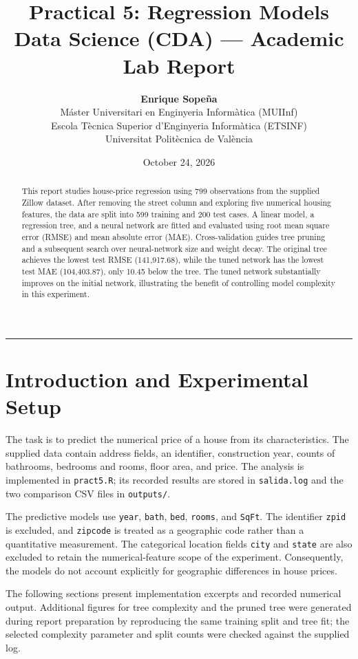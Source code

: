 \documentclass[11pt,a4paper]{article}
\title{\textbf{Practical 5: Regression Models}\\[0.4ex] \Large Data Science (CDA) --- Academic Lab Report}
\author{\textbf{Enrique Sopeña} \\ 
Máster Universitari en Enginyeria Informàtica (MUIInf) \\
Escola Tècnica Superior d'Enginyeria Informàtica (ETSINF) \\ 
Universitat Politècnica de València}
\date{October 24, 2026}
\begin{document}
\maketitle
\begin{abstract}
This report studies house-price regression using 799 observations from the supplied Zillow dataset. After removing the street column and exploring five numerical housing features, the data are split into 599 training and 200 test cases. A linear model, a regression tree, and a neural network are fitted and evaluated using root mean square error (RMSE) and mean absolute error (MAE). Cross-validation guides tree pruning and a subsequent search over neural-network size and weight decay. The original tree achieves the lowest test RMSE (141,917.68), while the tuned network has the lowest test MAE (104,403.87), only 10.45 below the tree. The tuned network substantially improves on the initial network, illustrating the benefit of controlling model complexity in this experiment.
\end{abstract}
\vspace{0.8em}\hrule\vspace{1em}

\section{Introduction and Experimental Setup}
The task is to predict the numerical price of a house from its characteristics. The supplied data contain address fields, an identifier, construction year, counts of bathrooms, bedrooms and rooms, floor area, and price. The analysis is implemented in \texttt{pract5.R}; its recorded results are stored in \texttt{salida.log} and the two comparison CSV files in \texttt{outputs/}.

The predictive models use \texttt{year}, \texttt{bath}, \texttt{bed}, \texttt{rooms}, and \texttt{SqFt}. The identifier \texttt{zpid} is excluded, and \texttt{zipcode} is treated as a geographic code rather than a quantitative measurement. The categorical location fields \texttt{city} and \texttt{state} are also excluded to retain the numerical-feature scope of the experiment. Consequently, the models do not account explicitly for geographic differences in house prices.

The following sections present implementation excerpts and recorded numerical output. Additional figures for tree complexity and the pruned tree were generated during report preparation by reproducing the same training split and tree fit; the selected complexity parameter and split counts were checked against the supplied log.
\end{document}

